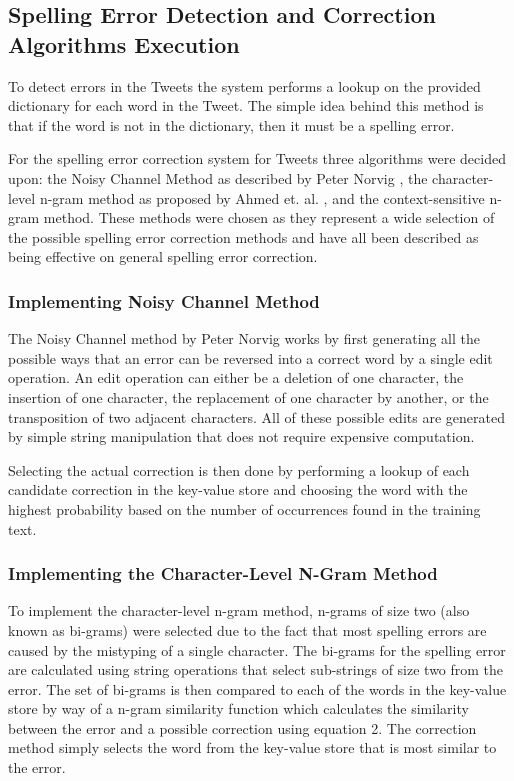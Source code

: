 \subsection{Spelling Error Detection and Correction Algorithms Execution}
To detect errors in the Tweets the system performs a lookup on the provided dictionary for each word in the Tweet. The simple idea behind this method is that if the word is not in the dictionary, then it must be a spelling error.

For the spelling error correction system for Tweets three algorithms were decided upon: the Noisy Channel Method as described by Peter Norvig \cite{}, the character-level n-gram method as proposed by Ahmed et. al. \cite{}, and the context-sensitive n-gram method. These methods were chosen as they represent a wide selection of the possible spelling error correction methods and have all been described as being effective on general spelling error correction.

\subsubsection{Implementing Noisy Channel Method}
The Noisy Channel method by Peter Norvig works by first generating all the possible ways that an error can be reversed into a correct word by a single edit operation. An edit operation can either be a deletion of one character, the insertion of one character, the replacement of one character by another, or the transposition of two adjacent characters. All of these possible edits are generated by simple string manipulation that does not require expensive computation.

Selecting the actual correction is then done by performing a lookup of each candidate correction in the key-value store and choosing the word with the highest probability based on the number of occurrences found in the training text.

\subsubsection{Implementing the Character-Level N-Gram Method}
To implement the character-level n-gram method, n-grams of size two (also known as bi-grams) were selected due to the fact that most spelling errors are caused by the mistyping of a single character. The bi-grams for the spelling error are calculated using string operations that select sub-strings of size two from the error. The set of bi-grams is then compared to each of the words in the key-value store by way of a n-gram similarity function which calculates the similarity between the error and a possible correction using equation 2. The correction method simply selects the word from the key-value store that is most similar to the error.

